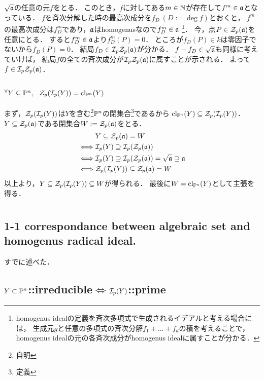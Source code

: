 \documentclass[a4paper]{jsarticle}
\begin{document}
    $\sqrt{\mathfrak{a}}$の任意の元$f$をとる．
    このとき，$f$に対してある$m \in \mathbb{N}$が存在して$f^m \in \mathfrak{a}$となっている．
    $f$を斉次分解した時の最高次成分を$f_D~(D:=\deg f)$とおくと，
    $f^m$の最高次成分は$f_D^m$であり，$\mathfrak{a}$はhomogenusなので$f_D^m \in \mathfrak{a}$
    \footnote{homogenus idealの定義を斉次多項式で生成されるイデアルと考える場合には，
    生成元$g$と任意の多項式の斉次分解$f_1+\dots+f_d$の積を考えることで，
    homogenus idealの元の各斉次成分がhomogenus idealに属すことが分かる．}．
    今，点$P \in \mathcal{Z}_p(\mathfrak{a})$を任意にとる．
    すると$f_D^m \in \mathfrak{a}$より$f_D^m(P)=0$．
    ところが$f_D(P) \in k$は零因子でないから$f_D(P)=0$．
    結局$f_D \in \mathcal{I}_p \mathcal{Z}_p(\mathfrak{a})$が分かる．
    $f-f_D \in \sqrt{\mathfrak{a}}$も同様に考えていけば，
    結局$f$の全ての斉次成分が$\mathcal{I}_p \mathcal{Z}_p(\mathfrak{a})$に属すことが示される．
    よって$f \in \mathcal{I}_p \mathcal{Z}_p(\mathfrak{a})$．


    \subsection{ ${}^{\forall} Y \subseteq \mathbb{P}^n,~~ \mathcal{Z}_p(\mathcal{I}_p(Y))=\operatorname{cl}_{\mathbb{P}^n}(Y)$}
    まず，$\mathcal{Z}_p(\mathcal{I}_p(Y))$は$Y$を含む\footnote{自明}$\mathbb{P}^n$の閉集合\footnote{定義}であるから
    $\operatorname{cl}_{\mathbb{P}^n}(Y) \subseteq \mathcal{Z}_p(\mathcal{I}_p(Y))$．
    $Y \subseteq \mathcal{Z}_p(\mathfrak{a})$である閉集合$W:=\mathcal{Z}_p(\mathfrak{a})$をとる．
    \begin{align*}
        {}&     Y \subseteq \mathcal{Z}_p(\mathfrak{a})=W \\
        \iff&   \mathcal{I}_p(Y) \supseteq \mathcal{I}_p(\mathcal{Z}_p(\mathfrak{a})) \\
        \iff&   \mathcal{I}_p(Y) \supseteq \mathcal{I}_p(\mathcal{Z}_p(\mathfrak{a}))=\sqrt{\mathfrak{a}} \supseteq \mathfrak{a} \\
        \iff&   \mathcal{Z}_p(\mathcal{I}_p(Y)) \subseteq \mathcal{Z}_p(\mathfrak{a})=W
    \end{align*}
    以上より，$Y \subseteq \mathcal{Z}_p(\mathcal{I}_p(Y)) \subseteq W$が得られる．
    最後に$W=\operatorname{cl}_{\mathbb{P}^n}(Y)$として主張を得る．

\section{ } %
    \subsection{1-1 correspondance between algebraic set and homogenus radical ideal.}
    すでに述べた．

    \subsection{ $Y \subset \mathbb{P}^n$::irreducible$\iff$$\mathcal{I}_p(Y)$::prime}
\end{document}

